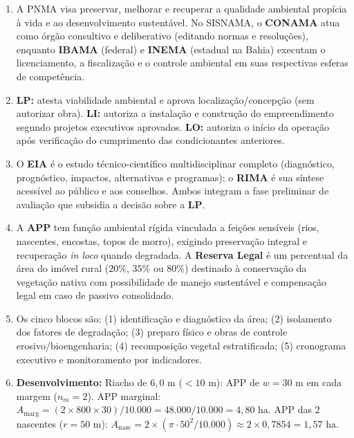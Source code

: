 \clearpage
{}

\begin{boxGabarito}
\begin{enumerate}[leftmargin=1.6em, itemsep=4pt]
  \item A PNMA visa preservar, melhorar e recuperar a qualidade ambiental propícia à vida e ao desenvolvimento sustentável. No SISNAMA, o \textbf{CONAMA} atua como órgão consultivo e deliberativo (editando normas e resoluções), enquanto \textbf{IBAMA} (federal) e \textbf{INEMA} (estadual na Bahia) executam o licenciamento, a fiscalização e o controle ambiental em suas respectivas esferas de competência.
  \item \textbf{LP:} atesta viabilidade ambiental e aprova localização/concepção (sem autorizar obra). \textbf{LI:} autoriza a instalação e construção do empreendimento segundo projetos executivos aprovados. \textbf{LO:} autoriza o início da operação após verificação do cumprimento das condicionantes anteriores.
  \item O \textbf{EIA} é o estudo técnico-científico multidisciplinar completo (diagnóstico, prognóstico, impactos, alternativas e programas); o \textbf{RIMA} é sua síntese acessível ao público e aos conselhos. Ambos integram a fase preliminar de avaliação que subsidia a decisão sobre a \textbf{LP}.
  \item A \textbf{APP} tem função ambiental rígida vinculada a feições sensíveis (rios, nascentes, encostas, topos de morro), exigindo preservação integral e recuperação \textit{in loco} quando degradada. A \textbf{Reserva Legal} é um percentual da área do imóvel rural ($20\%$, $35\%$ ou $80\%$) destinado à conservação da vegetação nativa com possibilidade de manejo sustentável e compensação legal em caso de passivo consolidado.
  \item Os cinco blocos são: (1) identificação e diagnóstico da área; (2) isolamento dos fatores de degradação; (3) preparo físico e obras de controle erosivo/bioengenharia; (4) recomposição vegetal estratificada; (5) cronograma executivo e monitoramento por indicadores.
  \item \textbf{Desenvolvimento:}
  Riacho de $6{,}0\text{ m}$ ($< 10\text{ m}$): APP de $w = 30\text{ m}$ em cada margem ($n_m = 2$).
  APP marginal: $A_{\text{marg}} = (2 \times 800 \times 30) / 10.000 = 48.000 / 10.000 = 4{,}80\text{ ha}$.
  APP das $2$ nascentes ($r = 50\text{ m}$): $A_{\text{nasc}} = 2 \times (\pi \cdot 50^2 / 10.000) \approx 2 \times 0{,}7854 = 1{,}57\text{ ha}$.

\end{enumerate}
\end{boxGabarito}
